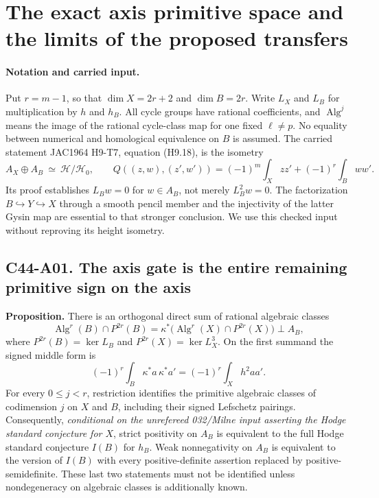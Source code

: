 \section{The exact axis primitive space and the limits of the proposed transfers}

\paragraph{Notation and carried input.}
Put $r=m-1$, so that $\dim X=2r+2$ and $\dim B=2r$.
Write $L_X$ and $L_B$ for multiplication by $h$ and $h_B$.
All cycle groups have rational coefficients, and $\operatorname{Alg}^j$
means the image of the rational cycle-class map for one fixed
$\ell\ne p$. No equality between numerical and homological equivalence
on $B$ is assumed. The carried statement JAC1964 H9-T7, equation
(H9.18), is the isometry
\[
 A_X\oplus A_B\ \simeq\ \mathcal H/\mathcal H_0,
 \qquad
 Q((z,w),(z',w'))=(-1)^m\int_Xzz'+(-1)^r\int_Bww'.
\]
Its proof establishes $L_Bw=0$ for $w\in A_B$, not merely
$L_B^2w=0$. The factorization $B\hookrightarrow Y\hookrightarrow X$
through a smooth pencil member and the injectivity of the latter
Gysin map are essential to that stronger conclusion. We use this
checked input without reproving its height isometry.

\subsection*{C44-A01. The axis gate is the entire remaining primitive sign on the axis}

\textbf{Proposition.}
There is an orthogonal direct sum of rational algebraic classes
\[
 \operatorname{Alg}^{r}(B)\cap P^{2r}(B)
 =\kappa^*\bigl(\operatorname{Alg}^{r}(X)\cap P^{2r}(X)\bigr)
       \mathbin{\perp} A_B,                                  \tag{C44.A01.1}
\]
where $P^{2r}(B)=\ker L_B$ and $P^{2r}(X)=\ker L_X^3$.
On the first summand the signed middle form is
\[
   (-1)^r\int_B\kappa^*a\,\kappa^*a'
       =(-1)^r\int_Xh^2aa'.                                 \tag{C44.A01.2}
\]
For every $0\le j<r$, restriction identifies the primitive algebraic
classes of codimension $j$ on $X$ and $B$, including their signed
Lefschetz pairings.
Consequently, \emph{conditional on the unrefereed 032/Milne input
asserting the Hodge standard conjecture for $X$}, strict positivity
on $A_B$ is equivalent to the full Hodge standard conjecture $I(B)$
for $h_B$. Weak nonnegativity on $A_B$ is equivalent to the version
of $I(B)$ with every positive-definite assertion replaced by
positive-semidefinite. These last two statements must not be
identified unless nondegeneracy on algebraic classes is additionally
known.

